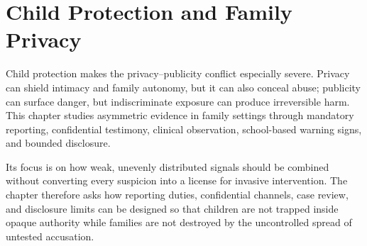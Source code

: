 
\chapter{Child Protection and Family Privacy}
\label{ch:ch087}

Child protection makes the privacy--publicity conflict especially severe. Privacy can shield intimacy and family autonomy, but it can also conceal abuse; publicity can surface danger, but indiscriminate exposure can produce irreversible harm. This chapter studies asymmetric evidence in family settings through mandatory reporting, confidential testimony, clinical observation, school-based warning signs, and bounded disclosure.

Its focus is on how weak, unevenly distributed signals should be combined without converting every suspicion into a license for invasive intervention. The chapter therefore asks how reporting duties, confidential channels, case review, and disclosure limits can be designed so that children are not trapped inside opaque authority while families are not destroyed by the uncontrolled spread of untested accusation.

